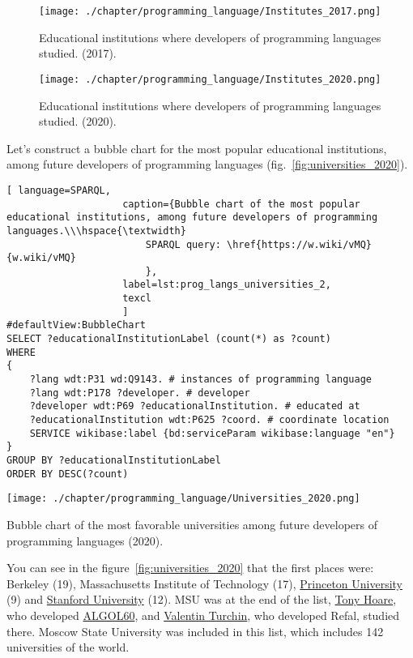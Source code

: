 \begin{figure}[h]
\centering
	\texttt{[image: ./chapter/programming\_language/Institutes\_2017.png]}
	\caption{Educational institutions where developers of programming languages studied. (2017).}
	\label{fig:institutes_2017}
\end{figure}

\begin{figure}[h]
\centering
	\texttt{[image: ./chapter/programming\_language/Institutes\_2020.png]}
	\caption{Educational institutions where developers of programming languages studied. (2020).}
	\label{fig:institutes_2020}
\end{figure}

Let's construct a bubble chart for the most popular educational institutions, among future developers of programming languages (fig.~\ref{fig:universities_2020}). 

\begin{lstlisting}[ language=SPARQL, 
                    caption={Bubble chart of the most popular educational institutions, among future developers of programming languages.\\\hspace{\textwidth}
                        SPARQL query: \href{https://w.wiki/vMQ}{w.wiki/vMQ}
                        },
                    label=lst:prog_langs_universities_2,
                    texcl 
                    ]
#defaultView:BubbleChart
SELECT ?educationalInstitutionLabel (count(*) as ?count)
WHERE
{
	?lang wdt:P31 wd:Q9143. # instances of programming language
	?lang wdt:P178 ?developer. # developer
	?developer wdt:P69 ?educationalInstitution. # educated at
	?educationalInstitution wdt:P625 ?coord. # coordinate location
	SERVICE wikibase:label {bd:serviceParam wikibase:language "en"} 	
}
GROUP BY ?educationalInstitutionLabel
ORDER BY DESC(?count)
\end{lstlisting}%

\begin{marginfigure}[-3cm]
	\texttt{[image: ./chapter/programming\_language/Universities\_2020.png]}
	\caption{Bubble chart of the most favorable universities among future developers of programming languages (2020).}
	\label{fig:universities_2020}
\end{marginfigure}

You can see in the figure~\ref{fig:universities_2020} that the first places were: Berkeley (19), Massachusetts Institute of Technology (17), \href{https://en.wikipedia.org/wiki/Princeton_University}{Princeton University} (9) and \href{https://en.wikipedia.org/wiki/Stanford_University}{Stanford University} (12). MSU was at the end of the list, \href{https://en.wikipedia.org/wiki/Tony_Hoare}{Tony Hoare}, who developed \href{https://en.wikipedia.org/wiki/ALGOL}{ALGOL60}, and \href{https://en.wikipedia.org/wiki/Valentin_Turchin}{Valentin Turchin}, who developed Refal, studied there. Moscow State University was included in this list, which includes 142 universities of the world.


